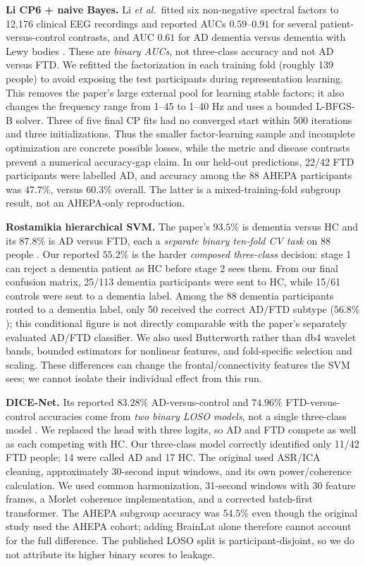 \documentclass[10pt,twocolumn,a4paper]{article}
\begin{document}
\noindent\textbf{Li CP6 + naive Bayes.} Li \emph{et al.}\ fitted six non-negative spectral factors to 12,176 clinical EEG recordings and reported AUCs $0.59$--$0.91$ for several patient-versus-control contrasts, and AUC $0.61$ for AD dementia versus dementia with Lewy bodies \cite{li2024}. These are \emph{binary AUCs}, not three-class accuracy and not AD versus FTD. We refitted the factorization in each training fold (roughly 139 people) to avoid exposing the test participants during representation learning. This removes the paper's large external pool for learning stable factors; it also changes the frequency range from 1--45 to 1--40 Hz and uses a bounded L-BFGS-B solver. Three of five final CP fits had no converged start within 500 iterations and three initializations. Thus the smaller factor-learning sample and incomplete optimization are concrete possible losses, while the metric and disease contrasts prevent a numerical accuracy-gap claim. In our held-out predictions, 22/42 FTD participants were labelled AD, and accuracy among the 88 AHEPA participants was $47.7\%$, versus $60.3\%$ overall. The latter is a mixed-training-fold subgroup result, not an AHEPA-only reproduction.

\noindent\textbf{Rostamikia hierarchical SVM.} The paper's $93.5\%$ is dementia versus HC and its $87.8\%$ is AD versus FTD, each a \emph{separate binary ten-fold CV task} on 88 people \cite{rostamikia2024}. Our reported $55.2\%$ is the harder \emph{composed three-class} decision: stage 1 can reject a dementia patient as HC before stage 2 sees them. From our final confusion matrix, 25/113 dementia participants were sent to HC, while 15/61 controls were sent to a dementia label. Among the 88 dementia participants routed to a dementia label, only 50 received the correct AD/FTD subtype ($56.8\%$); this conditional figure is not directly comparable with the paper's separately evaluated AD/FTD classifier. We also used Butterworth rather than db4 wavelet bands, bounded estimators for nonlinear features, and fold-specific selection and scaling. These differences can change the frontal/connectivity features the SVM sees; we cannot isolate their individual effect from this run.

\noindent\textbf{DICE-Net.} Its reported $83.28\%$ AD-versus-control and $74.96\%$ FTD-versus-control accuracies come from \emph{two binary LOSO models}, not a single three-class model \cite{dice2023}. We replaced the head with three logits, so AD and FTD compete as well as each competing with HC. Our three-class model correctly identified only 11/42 FTD people; 14 were called AD and 17 HC. The original used ASR/ICA cleaning, approximately 30-second input windows, and its own power/coherence calculation. We used common harmonization, 31-second windows with 30 feature frames, a Morlet coherence implementation, and a corrected batch-first transformer. The AHEPA subgroup accuracy was $54.5\%$ even though the original study used the AHEPA cohort; adding BrainLat alone therefore cannot account for the full difference. The published LOSO split is participant-disjoint, so we do not attribute its higher binary scores to leakage.
\end{document}
